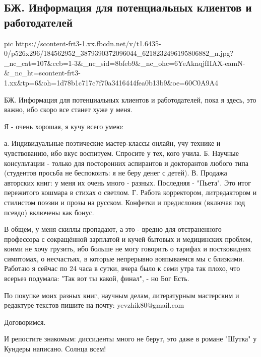  
 
 
 
 
\subsection{БЖ. Информация для потенциальных клиентов и работодателей}
\label{sec:11_05_2021.fb.bilchenko_evgenia.1.email_rabota}

\ifcmt
  pic https://scontent-frt3-1.xx.fbcdn.net/v/t1.6435-0/p526x296/184562952_3879390372096044_6218232496195806882_n.jpg?_nc_cat=107&ccb=1-3&_nc_sid=8bfeb9&_nc_ohc=6YeAknqjfIIAX-eamN-&_nc_ht=scontent-frt3-1.xx&tp=6&oh=1d78b1c717c7f70a3416444fea0b13b9&oe=60C0A9A4
\fi

БЖ. Информация для потенциальных клиентов и работодателей, пока я здесь, это
важно, ибо скоро все станет хуже у меня.

Я - очень хорошая, я кучу всего умею: 

а. Индивидуальные поэтические мастер-классы онлайн, учу технике и чувствованию, ибо вкус воспитуем. Спросите у тех, кого учила.
Б. Научные консультации - только  для посторонних аспирантов и докторантов любого типа (студентов просьба не беспокоить: я не беру денег с детей). 
В. Продажа авторских книг: у меня их очень много - разных. Последняя - "Пьета". Это итог пережитого кошмара в стихах о светлом.
Г. Работа корректором, литредактором и стилистом поэзии и прозы на русском. Конфетки и предисловия (включая под псевдо) включены как бонус.

В общем, у меня скиллы пропадают, а это - вредно для отстраненного профессора с
сокращённой зарплатой и кучей бытовых и медицинских проблем, коими не хочу
грузить, ибо больше не могу говорить о тарифах и постковиднвх симптомах, о
несчастьях, в которые непрерывно вояпываемся мы с близкими. Работаю я сейчас по
24 часа в сутки, вчера было к семи утра так плохо, что всерьез подумала: "Так
вот ты какой, финал", - но Бог Есть.

По покупке моих разных книг, научным делам, литературным мастерским и редактуре
текстов пишите на почту: yevzhik80@gmail.com 

Договоримся.

И репостите знакомым: диссиденты много не берут, это даже в романе "Шутка" у
Кундеры написано. Солнца всем!
